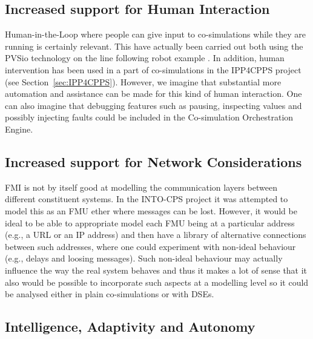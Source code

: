 \subsection{Increased support for Human Interaction}

Human-in-the-Loop where people can give input to co-simulations while they are running is certainly relevant. This have actually been carried out both using the PVSio technology on the line following robot example \cite{Palmieri&17}. In addition, human intervention has been used in a part of co-simulations in the IPP4CPPS project (see Section~\ref{sec:IPP4CPPS}). However, we imagine that substantial more automation and assistance can be made for this kind of human interaction. One can also imagine that debugging features such as pausing, inspecting values and possibly injecting faults could be included in the Co-simulation Orchestration Engine.


\subsection{Increased support for Network Considerations}

FMI is not by itself good at modelling the communication layers between different constituent systems. In the INTO-CPS project it was attempted to model this as an FMU ether where messages can be lost. However, it would be ideal to be able to appropriate model each FMU being at a particular address (e.g., a URL or an IP address) and then have a library of alternative connections between such addresses, where one could experiment with non-ideal behaviour (e.g., delays and loosing messages). Such non-ideal behaviour may actually influence the way the real system behaves and thus it makes a lot of sense that it also would be possible to incorporate such aspects at a modelling level so it could be analysed either in plain co-simulations or with DSEs.


\subsection{Intelligence, Adaptivity and Autonomy}

